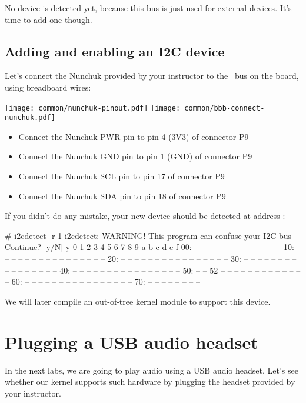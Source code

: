 {No device is detected yet, because this bus is just
used for external devices. It's time to add one though.

\subsection{Adding and enabling an I2C device}

Let's connect the Nunchuk provided by your instructor
to the \busname\ bus on the board, using breadboard wires:

\texttt{[image: common/nunchuk-pinout.pdf]}
\texttt{[image: common/bbb-connect-nunchuk.pdf]}

\begin{itemize}
\item Connect the Nunchuk PWR pin to pin 4 (3V3) of connector P9
\item Connect the Nunchuk GND pin to pin 1 (GND) of connector P9
\item Connect the Nunchuk SCL pin to pin 17 of connector P9
\item Connect the Nunchuk SDA pin to pin 18 of connector P9
\end{itemize}

If you didn't do any mistake, your new device should be detected at
address :

\begin{bashinput}
# i2cdetect -r 1
i2cdetect: WARNING! This program can confuse your I2C bus
Continue? [y/N] y
     0  1  2  3  4  5  6  7  8  9  a  b  c  d  e  f
00:          -- -- -- -- -- -- -- -- -- -- -- -- --
10: -- -- -- -- -- -- -- -- -- -- -- -- -- -- -- --
20: -- -- -- -- -- -- -- -- -- -- -- -- -- -- -- --
30: -- -- -- -- -- -- -- -- -- -- -- -- -- -- -- --
40: -- -- -- -- -- -- -- -- -- -- -- -- -- -- -- --
50: -- -- 52 -- -- -- -- -- -- -- -- -- -- -- -- --
60: -- -- -- -- -- -- -- -- -- -- -- -- -- -- -- --
70: -- -- -- -- -- -- -- --
\end{bashinput}

We will later compile an out-of-tree kernel module to support this device.

\section{Plugging a USB audio headset}

In the next labs, we are going to play audio using a USB audio headset.
Let's see whether our kernel supports such hardware by plugging the
headset provided by your instructor.

}
